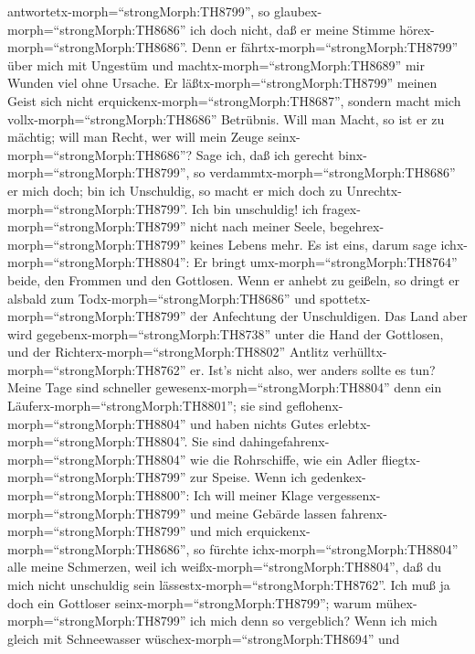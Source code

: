 antwortetx-morph=``strongMorph:TH8799'', so
glaubex-morph=``strongMorph:TH8686'' ich doch nicht, daß er meine Stimme
hörex-morph=``strongMorph:TH8686''.  Denn er
fährtx-morph=``strongMorph:TH8799'' über mich mit Ungestüm und
machtx-morph=``strongMorph:TH8689'' mir Wunden viel ohne Ursache.
 Er läßtx-morph=``strongMorph:TH8799'' meinen Geist sich
nicht erquickenx-morph=``strongMorph:TH8687'', sondern macht mich
vollx-morph=``strongMorph:TH8686'' Betrübnis.  Will man
Macht, so ist er zu mächtig; will man Recht, wer will mein Zeuge
seinx-morph=``strongMorph:TH8686''?  Sage ich, daß ich
gerecht binx-morph=``strongMorph:TH8799'', so
verdammtx-morph=``strongMorph:TH8686'' er mich doch; bin ich Unschuldig,
so macht er mich doch zu Unrechtx-morph=``strongMorph:TH8799''.
 Ich bin unschuldig! ich
fragex-morph=``strongMorph:TH8799'' nicht nach meiner Seele,
begehrex-morph=``strongMorph:TH8799'' keines Lebens mehr. 
Es ist eins, darum sage ichx-morph=``strongMorph:TH8804'': Er bringt
umx-morph=``strongMorph:TH8764'' beide, den Frommen und den Gottlosen.
 Wenn er anhebt zu geißeln, so dringt er alsbald zum
Todx-morph=``strongMorph:TH8686'' und
spottetx-morph=``strongMorph:TH8799'' der Anfechtung der Unschuldigen.
 Das Land aber wird gegebenx-morph=``strongMorph:TH8738''
unter die Hand der Gottlosen, und der
Richterx-morph=``strongMorph:TH8802'' Antlitz
verhülltx-morph=``strongMorph:TH8762'' er. Ist's nicht also, wer anders
sollte es tun?  Meine Tage sind schneller
gewesenx-morph=``strongMorph:TH8804'' denn ein
Läuferx-morph=``strongMorph:TH8801''; sie sind
geflohenx-morph=``strongMorph:TH8804'' und haben nichts Gutes
erlebtx-morph=``strongMorph:TH8804''.  Sie sind
dahingefahrenx-morph=``strongMorph:TH8804'' wie die Rohrschiffe, wie ein
Adler fliegtx-morph=``strongMorph:TH8799'' zur Speise. 
Wenn ich gedenkex-morph=``strongMorph:TH8800'': Ich will meiner Klage
vergessenx-morph=``strongMorph:TH8799'' und meine Gebärde lassen
fahrenx-morph=``strongMorph:TH8799'' und mich
erquickenx-morph=``strongMorph:TH8686'',  so fürchte
ichx-morph=``strongMorph:TH8804'' alle meine Schmerzen, weil ich
weißx-morph=``strongMorph:TH8804'', daß du mich nicht unschuldig sein
lässestx-morph=``strongMorph:TH8762''.  Ich muß ja doch ein
Gottloser seinx-morph=``strongMorph:TH8799''; warum
mühex-morph=``strongMorph:TH8799'' ich mich denn so vergeblich?
 Wenn ich mich gleich mit Schneewasser
wüschex-morph=``strongMorph:TH8694'' und
